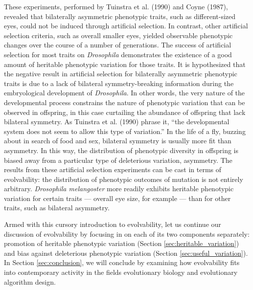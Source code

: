 These experiments, performed by Tuinstra et al. (1990) and Coyne (1987), revealed that bilaterally asymmetric phenotypic traits, such as different-sized eyes, could not be induced through artificial selection. In contrast, other artificial selection criteria, such as overall smaller eyes, yielded observable phenotypic changes over the course of a number of generations. The success of artificial selection for most traits on \textit{Drosophila} demonstrates the existence of a good amount of heritable phenotypic variation for those traits.  It is hypothesized that the negative result in artificial selection for bilaterally asymmetric phenotypic traits is due to a lack of bilateral symmetry-breaking information during the embryological development of \textit{Drosophila}. In other words, the very nature of the developmental process constrains the nature of phenotypic variation that can be observed in offspring, in this case curtailing the abundance of offspring that lack bilateral symmetry. As Tuinstra et al. (1990) phrase it, ``the developmental system does not seem to allow this type of variation.'' In the life of a fly, buzzing about in search of food and sex, bilateral symmetry is usually more fit than asymmetry. In this way, the distribution of phenotypic diversity in offspring is biased away from a particular type of deleterious variation, asymmetry. The results from these artificial selection experiments can be cast in terms of evolvability: the distribution of phenotypic outcomes of mutation is not entirely arbitrary. \textit{Drosophila melangoster}  more readily exhibits heritable phenotypic variation for certain traits --- overall eye size, for example --- than for other traits, such as bilateral asymmetry.

Armed with this cursory introduction to evolvability, let us continue our discussion of evolvability by focusing in on each of its two components separately: promotion of heritable phenotypic variation (Section \ref{sec:heritable_variation}) and bias against deleterious phenotypic variation (Section \ref{sec:useful_variation}). In Section \ref{sec:conclusion}, we will conclude by examining how evolvability fits into contemporary activity in the fields evolutionary biology and evolutionary algorithm design.
